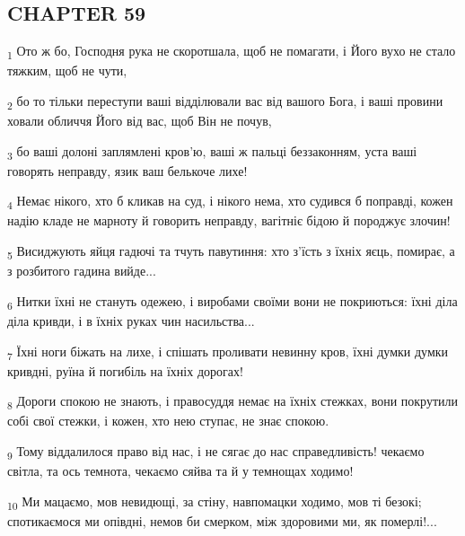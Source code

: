 \subsection{CHAPTER 59}
\begin{tcolorbox}
\textsubscript{1} Ото ж бо, Господня рука не скоротшала, щоб не помагати, і Його вухо не стало тяжким, щоб не чути,
\end{tcolorbox}
\begin{tcolorbox}
\textsubscript{2} бо то тільки переступи ваші відділювали вас від вашого Бога, і ваші провини ховали обличчя Його від вас, щоб Він не почув,
\end{tcolorbox}
\begin{tcolorbox}
\textsubscript{3} бо ваші долоні заплямлені кров'ю, ваші ж пальці беззаконням, уста ваші говорять неправду, язик ваш белькоче лихе!
\end{tcolorbox}
\begin{tcolorbox}
\textsubscript{4} Немає нікого, хто б кликав на суд, і нікого нема, хто судився б поправді, кожен надію кладе не марноту й говорить неправду, вагітніє бідою й породжує злочин!
\end{tcolorbox}
\begin{tcolorbox}
\textsubscript{5} Висиджують яйця гадючі та тчуть павутиння: хто з'їсть з їхніх яєць, помирає, а з розбитого гадина вийде...
\end{tcolorbox}
\begin{tcolorbox}
\textsubscript{6} Нитки їхні не стануть одежею, і виробами своїми вони не покриються: їхні діла діла кривди, і в їхніх руках чин насильства...
\end{tcolorbox}
\begin{tcolorbox}
\textsubscript{7} Їхні ноги біжать на лихе, і спішать проливати невинну кров, їхні думки думки кривдні, руїна й погибіль на їхніх дорогах!
\end{tcolorbox}
\begin{tcolorbox}
\textsubscript{8} Дороги спокою не знають, і правосуддя немає на їхніх стежках, вони покрутили собі свої стежки, і кожен, хто нею ступає, не знає спокою.
\end{tcolorbox}
\begin{tcolorbox}
\textsubscript{9} Тому віддалилося право від нас, і не сягає до нас справедливість! чекаємо світла, та ось темнота, чекаємо сяйва та й у темнощах ходимо!
\end{tcolorbox}
\begin{tcolorbox}
\textsubscript{10} Ми мацаємо, мов невидющі, за стіну, навпомацки ходимо, мов ті безокі; спотикаємося ми опівдні, немов би смерком, між здоровими ми, як померлі!...
\end{tcolorbox}
